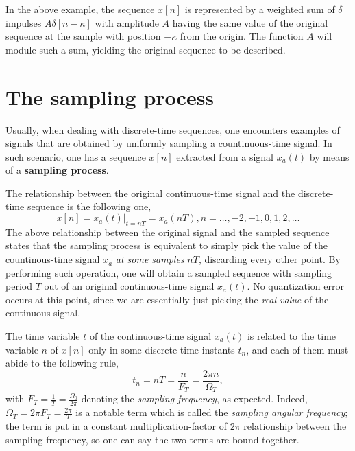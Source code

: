 \documentclass[\documentfontsize, twocolumn]{\classname}
\begin{document}
In the above example, the se\-quen\-ce $x[n]$ is represented by a weighted sum of $\delta$ impulses $A\delta[n-\kappa]$ with amplitude $A$ having the same value of the original se\-quen\-ce at the sample with position $-\kappa$ from the origin. The function $A$ will module such a sum, yielding the original sequence to be described.


\section{The sampling process}

Usually, when dealing with discrete-time se\-quen\-ces, one encounters examples of signals that are obtained by uniformly sampling a countinuous-time signal. In such scenario, one has a se\-quen\-ce $x[n]$ extracted from a signal $x_a(t)$ by means of a \textbf{sampling process}.

The relationship between the original con\-ti\-nuo\-us-time signal and the discrete-time se\-quen\-ce is the following one,
\[
    x[n] = x_a(t)\Bigr\rvert_{t=nT} = x_a(nT), n = \dots,-2,-1,0,1,2,\dots
\]
The above relationship between the original signal and the sampled se\-quen\-ce states that the sampling process is equivalent to simply pick the value of the countinous-time signal $x_a$ \emph{at some samples} $nT$, discarding every other point. By performing such operation, one will obtain a sampled se\-quen\-ce with sampling period $T$ out of an original continuous-time signal $x_a(t)$. No quantization error occurs at this point, since we are essentially just picking the \emph{real value} of the continuous signal.

The time variable $t$ of the con\-ti\-nuo\-us-time signal $x_a(t)$ is related to the time variable $n$ of $x[n]$ only in some discrete-time instants $t_n$, and each of them must abide to the following rule,
\begin{equation}\label{eqn:timeSamplingRule}
    t_n = nT = \frac n {F_T} = \frac {2\pi n} {\Omega_T},
\end{equation}
with $F_T = \frac 1 T = \frac {\Omega_0} {2\pi}$ denoting the \emph{sampling frequency}, as expected. Indeed, $\Omega_T = 2\pi F_T = \frac{2\pi}{T}$ is a notable term which is called the \emph{sampling angular frequency}; the term is put in a constant multiplication-factor of $2\pi$ relationship between the sampling frequency, so one can say the two terms are bound together.
\end{document}
